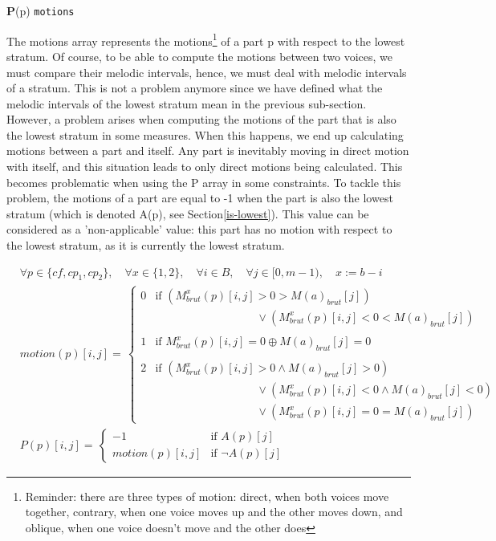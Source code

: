 \vspace{.5cm}
\noindent \textbf{P}(p) \hspace*{.2cm} \texttt{motions}

The motions array represents the motions\footnote{Reminder: there are three types of motion: direct, when both voices move together, contrary, when one voice moves up and the other moves down, and oblique, when one voice doesn't move and the other does} of a part p with respect to the lowest stratum. Of course, to be able to compute the motions between two voices, we must compare their melodic intervals, hence, we must deal with melodic intervals of a stratum. This is not a problem anymore since we have defined what the melodic intervals of the lowest stratum mean in the previous sub-section.
However, a problem arises when computing the motions of the part that is also the lowest stratum in some measures. When this happens, we end up calculating motions between a part and itself. Any part is inevitably moving in direct motion with itself, and this situation leads to only direct motions being calculated. This becomes problematic when using the P array in some constraints. To tackle this problem, the motions of a part are equal to -1 when the part is also the lowest stratum (which is denoted A(p), see Section\ref{is-lowest}). This value can be considered as a 'non-applicable' value: this part has no motion with respect to the lowest stratum, as it is currently the lowest stratum.

\begin{equation}
\begin{aligned}
&\forall p \in \{\mathit{cf}, cp_1, cp_2\}, \quad \forall x \in \{1, 2\}, \quad \forall i \in B, \quad \forall j \in [0, m - 1),\quad x := b - i\\
    &motion(p)[i,j] = \,  
    \begin{cases}
        0 &\text{if } (M_{brut}^{x}(p)[i, j] > 0 > M(a)_{brut}[j]) \\ & \quad \quad \quad \quad \quad \quad \quad \quad \quad  \vee (M_{brut}^{x}(p)[i, j] < 0 < M(a)_{brut}[j]) \\
        &\\
        1 &\text{if } M_{brut}^{x}(p)[i, j] = 0  \oplus M(a)_{brut}[j]=0 \\
        &\\
        2 &\text{if } (M_{brut}^{x}(p)[i, j] > 0 \land M(a)_{brut}[j] > 0) \\ & \quad \quad \quad \quad \quad \quad \quad \quad \quad   \vee  (M_{brut}^{x}(p)[i, j] < 0 \land M(a)_{brut}[j] <0)\\
        &\quad \quad \quad \quad \quad \quad \quad \quad \quad \vee (M_{brut}^{x}(p)[i, j] = 0 = M(a)_{brut}[j])
    \end{cases} 
    \\
    &P(p)[i,j] = \,  
    \begin{cases}
        -1 & \text{if } A(p)[j] \\
        motion(p)[i,j] & \text{if } \neg A(p)[j]
    \end{cases}
\end{aligned}
\label{eq:motions}
\end{equation}

